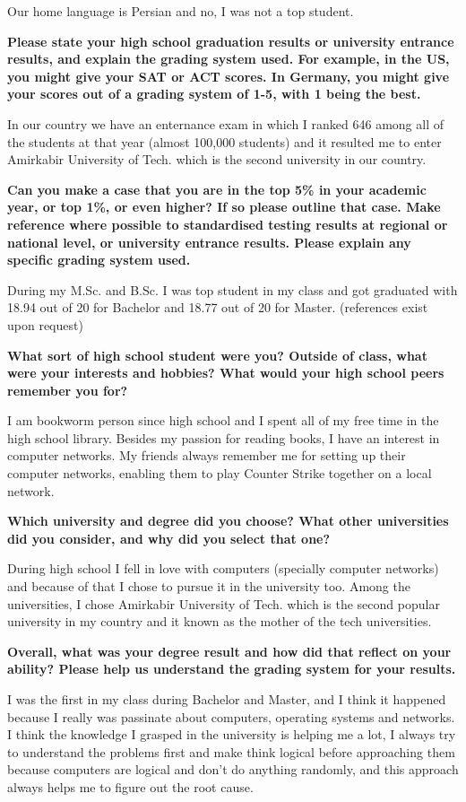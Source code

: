 Our home language is Persian and no, I was not a top student.

\noindent
\textbf{Please state your high school graduation results or university entrance results, and explain the grading system used. For example, in the US, you might give your SAT or ACT scores.
In Germany, you might give your scores out of a grading system of 1-5, with 1 being the best.}

In our country we have an enternance exam in which I ranked 646 among all of the students at that year
(almost 100,000 students) and it resulted me to enter Amirkabir University of Tech. which is the second university in our country.

\noindent
\textbf{Can you make a case that you are in the top 5\% in your academic year, or top 1\%, or even higher?
If so please outline that case. Make reference where possible to standardised testing results at regional or national level,
or university entrance results. Please explain any specific grading system used.}

During my M.Sc. and B.Sc. I was top student in my class and got graduated with 18.94 out of 20 for Bachelor and 18.77 out of 20 for Master.
(references exist upon request)

\noindent
\textbf{What sort of high school student were you? Outside of class, what were your interests and hobbies? What would your high school peers remember you for?}

I am bookworm person since high school and I spent all of my free time in the high school library.
Besides my passion for reading books, I have an interest in computer networks. My friends always remember me for
setting up their computer networks, enabling them to play Counter Strike together on a local network.

\noindent
\textbf{Which university and degree did you choose? What other universities did you consider, and why did you select that one?}

During high school I fell in love with computers (specially computer networks) and because of that I chose to pursue
it in the university too. Among the universities, I chose Amirkabir University of Tech. which is the second popular
university in my country and it known as the mother of the tech universities.

\noindent
\textbf{Overall, what was your degree result and how did that reflect on your ability? Please help us understand the grading system for your results.}

I was the first in my class during Bachelor and Master, and I think it happened because I really was passinate about computers,
operating systems and networks. I think the knowledge I grasped in the university is helping me a lot, I always
try to understand the problems first and make think logical before approaching them because computers are logical
and don't do anything randomly, and this approach always helps me to figure out the root cause.


